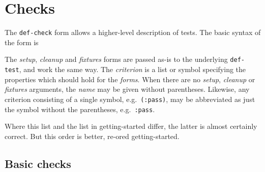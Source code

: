 \section{Checks}
 The
\texttt{def-check}
form allows a higher-level description of tests.  The basic syntax of
the form is
\begin{tabbing}\hspace*{1cm}
\end{tabbing}
The \textit{setup}, \textit{cleanup} and \textit{fixtures} forms are
passed as-is to the underlying \texttt{def-test}, and work the same
way.  The \textit{criterion} is a list or symbol specifying the
properties which should hold for the \textit{forms}.  When there are
no \textit{setup}, \textit{cleanup} or \textit{fixtures} arguments,
the \textit{name} may be given without parentheses.  Likewise, any
criterion consisting of a single symbol, e.g.\ \texttt{(:pass)}, may
be abbreviated as just the symbol without the parentheses, e.g.\
\texttt{:pass}.

 Where this list and the list in getting-started
differ, the latter is almost certainly correct.  But this order is
better, re-ored getting-started.

\def\criteriaGroup#1{\subsection{#1}}
\def\endcriteriaGroup{}
\def\criteriaDoc#1#2#3#4#5#6#7{%
\subsubsection{The \texttt{#2} check} 
#4\index{#1@\texttt{#2}}
\\ Syntax: \texttt{#3}
#6{#7}}
\def\noEx#1{}
\def\singleEx#1{\\Example: \texttt{#1}}
\def\multiEx#1{}
\def\tabbingEx#1{}


\subsection{Basic checks}

